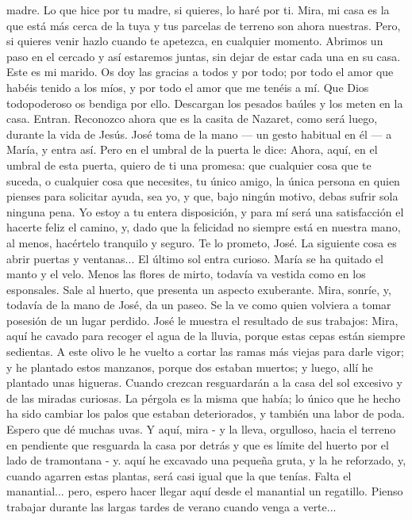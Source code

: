 \documentclass[12pt]{book} %
\begin{document}
madre. Lo que hice por tu madre, si quieres, lo haré por ti. Mira, mi casa es la que está más cerca de la tuya y tus parcelas de terreno son ahora nuestras. Pero, si quieres venir hazlo cuando te apetezca, en cualquier momento. Abrimos un paso en el cercado y así estaremos juntas, sin dejar de estar cada una en su casa. Este es mi marido. 
Os doy las gracias a todos y por todo; por todo el amor que habéis tenido a los míos, y por todo el amor que me tenéis 
a mí. Que Dios todopoderoso os bendiga por ello. 
Descargan los pesados baúles y los meten en la casa. Entran. Reconozco ahora que es la casita de Nazaret, como será 
luego, durante la vida de Jesús. 
José toma de la mano — un gesto habitual en él — a María, y entra así. Pero en el umbral de la puerta le dice: 
Ahora, aquí, en el umbral de esta puerta, quiero de ti una promesa: que cualquier cosa que te suceda, o cualquier cosa 
que necesites, tu único amigo, la única persona en quien pienses para solicitar ayuda, sea yo, y que, bajo ningún motivo, debas sufrir sola ninguna pena. Yo estoy a tu entera disposición, y para mí será una satisfacción el hacerte feliz el camino, y, dado que la felicidad no siempre está en nuestra mano, al menos, hacértelo tranquilo y seguro. 
Te lo prometo, José. 
La siguiente cosa es abrir puertas y ventanas... El último sol entra curioso. 
María se ha quitado el manto y el velo. Menos las flores de mirto, todavía va vestida como en los esponsales. Sale al huerto, que presenta un aspecto exuberante. Mira, sonríe, y, todavía de la mano de José, da un paseo. Se la ve como quien volviera a tomar posesión de un lugar perdido. 
José le muestra el resultado de sus trabajos: 
Mira, aquí he cavado para recoger el agua de la lluvia, porque estas cepas están siempre sedientas. A este olivo le he 
vuelto a cortar las ramas más viejas para darle vigor; y he plantado estos manzanos, porque dos estaban muertos; y luego, allí he plantado unas higueras. Cuando crezcan resguardarán a la casa del sol excesivo y de las miradas curiosas. La pérgola es la misma que había; lo único que he hecho ha sido cambiar los palos que estaban deteriorados, y también una labor de poda. Espero que dé muchas uvas. Y aquí, mira - y la lleva, orgulloso, hacia el terreno en pendiente que resguarda la casa por detrás y que es límite del huerto por el lado de tramontana - y. aquí he excavado una pequeña gruta, y la he reforzado, y, cuando agarren estas plantas, será casi igual que la que tenías. Falta el manantial... pero, espero hacer llegar aquí desde el manantial un regatillo. 
Pienso trabajar durante las largas tardes de verano cuando venga a verte... 
\end{document}
